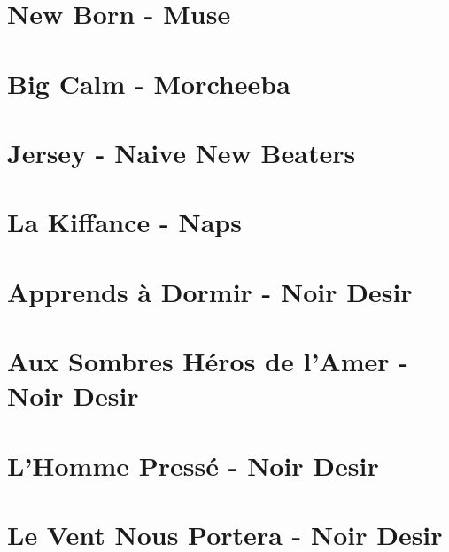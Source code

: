 \documentclass[11pt]{article}
\begin{document}
\section{New Born - Muse}




\section{Big Calm - Morcheeba}


\section{Jersey - Naive New Beaters}
\begin{guitar}

\end{guitar}

\section{La Kiffance - Naps}


\section{Apprends à Dormir - Noir Desir}
\begin{guitar}

\end{guitar}

\section{Aux Sombres Héros de l'Amer - Noir Desir}
\begin{guitar}

\end{guitar}


\section{L'Homme Pressé - Noir Desir}
\begin{guitar}

\end{guitar}

\section{Le Vent Nous Portera - Noir Desir}
\begin{guitar}

\end{guitar}
\end{document}
